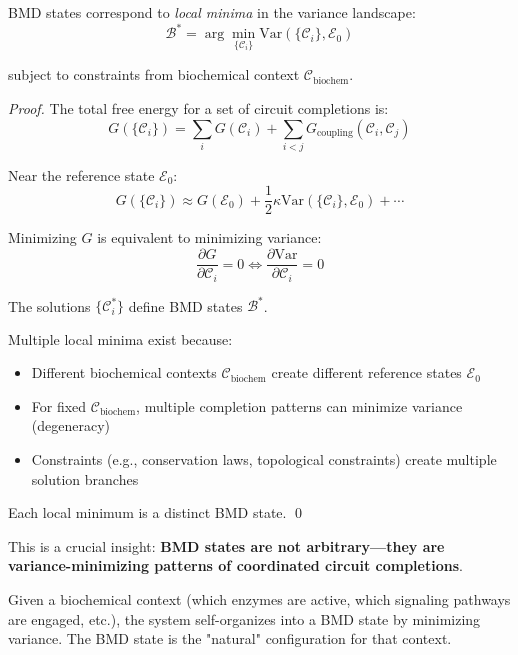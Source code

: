 \begin{theorem}
\label{thm:bmd_variance_minima}
BMD states correspond to \textit{local minima} in the variance landscape:
\begin{equation}
\mathcal{B}^* = \arg\min_{\{\mathcal{C}_i\}} \text{Var}(\{\mathcal{C}_i\}, \mathcal{E}_0)
\end{equation}

subject to constraints from biochemical context $\mathcal{C}_{\text{biochem}}$.
\end{theorem}

\begin{proof}
The total free energy for a set of circuit completions is:
\begin{equation}
G(\{\mathcal{C}_i\}) = \sum_i G(\mathcal{C}_i) + \sum_{i<j} G_{\text{coupling}}(\mathcal{C}_i, \mathcal{C}_j)
\end{equation}

Near the reference state $\mathcal{E}_0$:
\begin{equation}
G(\{\mathcal{C}_i\}) \approx G(\mathcal{E}_0) + \frac{1}{2} \kappa \text{Var}(\{\mathcal{C}_i\}, \mathcal{E}_0) + \cdots
\end{equation}

Minimizing $G$ is equivalent to minimizing variance:
\begin{equation}
\frac{\partial G}{\partial \mathcal{C}_i} = 0 \iff \frac{\partial \text{Var}}{\partial \mathcal{C}_i} = 0
\end{equation}

The solutions $\{\mathcal{C}_i^*\}$ define BMD states $\mathcal{B}^*$.

Multiple local minima exist because:
\begin{itemize}
\item Different biochemical contexts $\mathcal{C}_{\text{biochem}}$ create different reference states $\mathcal{E}_0$
\item For fixed $\mathcal{C}_{\text{biochem}}$, multiple completion patterns can minimize variance (degeneracy)
\item Constraints (e.g., conservation laws, topological constraints) create multiple solution branches
\end{itemize}

Each local minimum is a distinct BMD state. \qed
\end{proof}

\begin{remark}
This is a crucial insight: \textbf{BMD states are not arbitrary—they are variance-minimizing patterns of coordinated circuit completions}.

Given a biochemical context (which enzymes are active, which signaling pathways are engaged, etc.), the system self-organizes into a BMD state by minimizing variance. The BMD state is the "natural" configuration for that context.
\end{remark}

